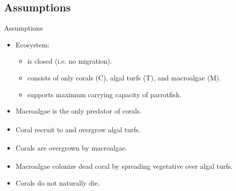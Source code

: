 \documentclass{beamer}
\begin{document}
\subsection{Assumptions}
\begin{frame}{Assumptions}
    \begin{itemize}
        \item Ecosystem:
        \begin{itemize}
            \item is closed (i.e. no migration).
            \item consists of only corals (C), algal turfs (T), and macroalgae (M).
            \item supports maximum carrying capacity of parrotfish.
        \end{itemize}
        \item Macroalgae is the only predator of corals.
        \item Coral recruit to and overgrow algal turfs\textsuperscript{\cite{04_mathanalysis}}.
        \item Corals are overgrown by macroalgae\textsuperscript{\cite{04_mathanalysis}}.
        \item Macroalgae colonize dead coral by spreading vegetative over algal turfs\textsuperscript{\cite{04_mathanalysis}}.
        \item Corals do not naturally die.
    \end{itemize}
\end{frame}
\end{document}
